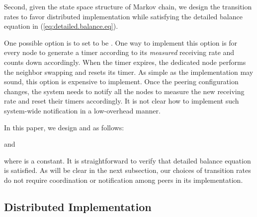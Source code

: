 \documentclass[10pt,conference]{IEEEtran}
\begin{document}
Second, given the state space structure of Markov chain, we design
the transition rates to favor distributed implementation
while satisfying the detailed balance equation in (\ref{eq:detailed.balance.eq}).

One possible option is to set  to be .
One way to implement this option is for every node to generate a timer according to its
\emph{measured} receiving rate and counts down accordingly. When the
timer expires, the dedicated node performs the neighbor swapping and resets its timer. As
simple as the implementation may sound, this option is expensive to implement. Once
the peering configuration changes, the system needs to notify all
the nodes to measure the new receiving rate and reset their timers
accordingly. It is not clear how to implement such system-wide notification
in a low-overhead manner.

In this paper, we design  and
 as follows:

and

where  is a constant. It is straightforward to verify that
detailed balance equation is satisfied. As will be clear in the next subsection, our choices of transition rates
do not require coordination or notification among peers in its implementation.


\subsection{Distributed Implementation\label{sub:Distributed-Implementation}}
\end{document}
